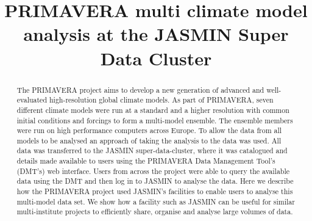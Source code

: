 \documentclass[gmd, manuscript]{copernicus}
\begin{document}
\title{PRIMAVERA multi climate model analysis at the JASMIN Super Data Cluster}













\received{}
\pubdiscuss{} %
\revised{}
\accepted{}
\published{}




\maketitle



\begin{abstract}
The PRIMAVERA project aims to develop a new generation of advanced and well-evaluated high-resolution global climate models. As part of PRIMAVERA, seven different climate models were run at a standard and a higher resolution with common initial conditions and forcings to form a multi-model ensemble. The ensemble members were run on high performance computers across Europe. To allow the data from all models to be analysed an approach of taking the analysis to the data was used. All data was transferred to the JASMIN super-data-cluster, where it was catalogued and details made available to users using the PRIMAVERA Data Management Tool's (DMT's) web interface. Users from across the project were able to query the available data using the DMT and then log in to JASMIN to analyse the data. Here we describe how the PRIMAVERA project used JASMIN's facilities to enable users to analyse this multi-model data set. We show how a facility such as JASMIN can be useful for similar multi-institute projects to efficiently share, organise and analyse large volumes of data.
\end{abstract}
\end{document}
